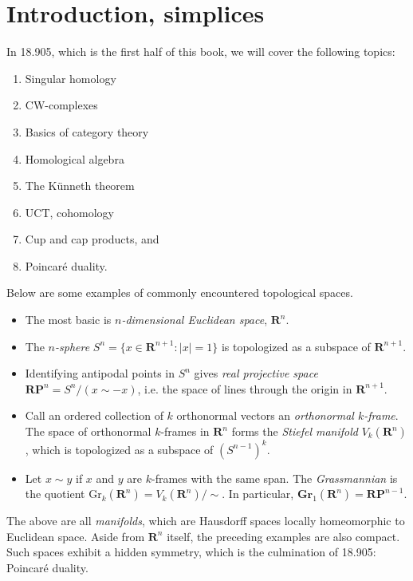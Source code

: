 
\section{Introduction, simplices}\label{905}
In 18.905, which is the first half of this book, we will cover the following topics:
\begin{enumerate}
    \item Singular homology
    \item CW-complexes
    \item Basics of category theory
    \item Homological algebra
    \item The K\"{u}nneth theorem
    \item UCT, cohomology
    \item Cup and cap products, and
    \item Poincar\'{e} duality.
\end{enumerate}
Below are some examples of commonly encountered topological spaces.
\begin{itemize}
    \item The most basic is \emph{$n$-dimensional Euclidean space}, $\mathbf{R}^n$.
    \item The \emph{$n$-sphere} $S^n=\{x\in \mathbf{R}^{n+1}:|x|=1\}$ is topologized as a subspace of $\mathbf{R}^{n+1}$.
    \item Identifying antipodal points in $S^n$ gives \emph{real projective space} $\mathbf{RP}^n=S^n / (x\sim -x)$, i.e. the space of lines through the origin in $\mathbf{R}^{n+1}$.
    \item Call an ordered collection of $k$ orthonormal vectors an \emph{orthonormal $k$-frame}. The space of orthonormal $k$-frames in $\mathbf{R}^n$ forms the \emph{Stiefel manifold} $V_k(\mathbf{R}^n)$, which is topologized as a subspace of $(S^{n-1})^k$.
    \item Let $x\sim y$ if $x$ and $y$ are $k$-frames with the same span. The \emph{Grassmannian} is the quotient $\mathrm{Gr}_k(\mathbf{R}^n)=V_k(\mathbf{R}^n)/\sim$. In particular, $\mathbf{Gr}_1(\mathbf{R}^n) = \mathbf{RP}^{n-1}$.
\end{itemize}
The above are all \emph{manifolds}, which are Hausdorff spaces locally homeomorphic to Euclidean space. Aside from $\mathbf{R}^n$ itself, the preceding examples are also compact. Such spaces exhibit a hidden symmetry, which is the culmination of 18.905: Poincar\'{e} duality.

